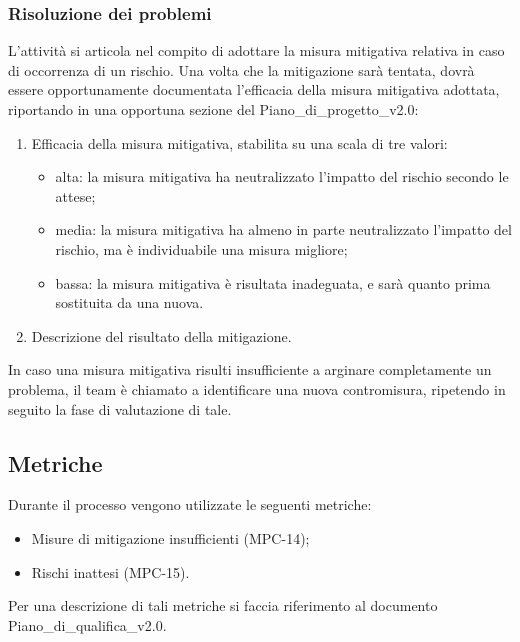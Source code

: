 \subsubsection{Risoluzione dei problemi}
L'attività si articola nel compito di adottare la misura mitigativa relativa in caso di occorrenza di un rischio. Una volta che la mitigazione sarà tentata, dovrà essere opportunamente documentata l'efficacia della misura mitigativa adottata, riportando in una opportuna sezione del Piano\_di\_progetto\_v2.0:
\begin{enumerate}
    \item Efficacia della misura mitigativa, stabilita su una scala di tre valori:
    \begin{itemize}
        \item alta: la misura mitigativa ha neutralizzato l'impatto del rischio secondo le attese;
        \item media: la misura mitigativa ha almeno in parte neutralizzato l'impatto del rischio, ma è individuabile una misura migliore;
        \item bassa: la misura mitigativa è risultata inadeguata, e sarà quanto prima sostituita da una nuova.
    \end{itemize}
    \item Descrizione del risultato della mitigazione.
\end{enumerate}
In caso una misura mitigativa risulti insufficiente a arginare completamente un problema, il team è chiamato a identificare una nuova contromisura, ripetendo in seguito la fase di valutazione di tale.
\subsection{Metriche}
Durante il processo vengono utilizzate le seguenti metriche:
\begin{itemize}
    \item Misure di mitigazione insufficienti (MPC-14);
    \item Rischi inattesi (MPC-15).
\end{itemize}
Per una descrizione di tali metriche si faccia riferimento al documento Piano\_di\_qualifica\_v2.0.
